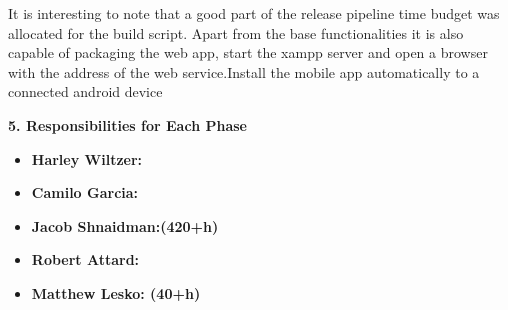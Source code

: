 \documentclass[12pt]{article}
\begin{document}
It is interesting to note that a good part of the release pipeline time budget was allocated for the build script. Apart from the base functionalities it is also capable of packaging the web app, start the xampp server and open a browser with the address of the web service.Install the mobile app automatically to a connected android device

\textbf{5. Responsibilities for Each Phase}
\begin{itemize}
    \item \textbf{Harley Wiltzer: }
    \item \textbf{Camilo Garcia: }
    \item \textbf{Jacob Shnaidman:(420+h) }
    \item \textbf{Robert Attard: }
    \item \textbf{Matthew Lesko: (40+h)} 
\end{itemize}
\end{document}
